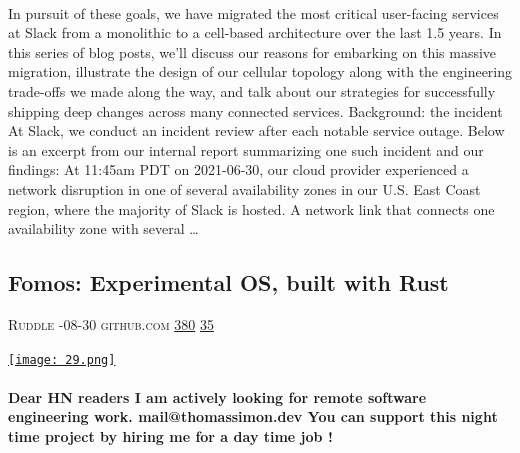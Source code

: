 \documentclass[10pt,a4paper]{article}
\begin{document}
\begin{multicols}{2}
\paragraph{}
 In pursuit of these goals, we have migrated the most critical user-facing services at Slack from a monolithic to a cell-based architecture over the last 1.5 years. In this series of blog posts, we’ll discuss our reasons for embarking on this massive migration, illustrate the design of our cellular topology along with the engineering trade-offs we made along the way, and talk about our strategies for successfully shipping deep changes across many connected services.
Background: the incident
At Slack, we conduct an incident review after each notable service outage. Below is an excerpt from our internal report summarizing one such incident and our findings:
At 11:45am PDT on 2021-06-30, our cloud provider experienced a network disruption in one of several availability zones in our U.S. East Coast region, where the majority of Slack is hosted. A network link that connects one availability zone with several 
\dots\par
\noindent\begin{minipage}{\linewidth}
\medskip
\subsection{Fomos: Experimental OS, built with Rust}
\textsc{\footnotesize
{\scriptsize\faUser}\space 
Ruddle 
{\scriptsize\faCalendar}-08-30 
{\scriptsize\faGithub}\space 
github.com 
{\scriptsize\faThumbsOUp}\space 
\href{http://news.ycombinator.com/item?id=37316309\&utm\_term=comment}{380} 
{\scriptsize\faComments}\space 
\href{http://news.ycombinator.com/item?id=37316309\&utm\_term=comment}{35} 
}
\par\medskip\noindent
\href{https://github.com/Ruddle/Fomos?utm\_source=hackernewsletter\&utm\_medium=email\&utm\_term=code}{
    \texttt{[image: 29.png]}
}
\end{minipage}
\paragraph{}
\textbf{Dear HN readers
I am actively looking for remote software engineering work. mail@thomassimon.dev You can support this night time project by hiring me for a day time job !}
\paragraph{}


\end{multicols}
\end{document}
